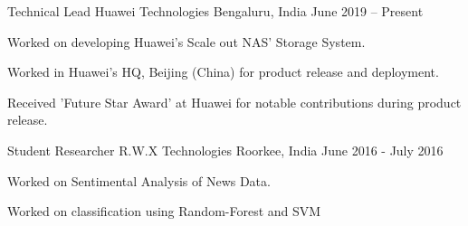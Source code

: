 

\begin{cventries}

 \cventry
    {Technical Lead} %
    {Huawei Technologies} %
    {Bengaluru, India} %
    {June 2019 – Present} %
    {
      \begin{cvitems} %
        \item {Worked on developing Huawei's Scale out NAS' Storage System.}
        \item {Worked in Huawei's HQ, Beijing (China) for product release and deployment.}
        \item {Received 'Future Star Award' at Huawei for notable contributions during product release.}
      \end{cvitems}
    }
  \cventry
    {Student Researcher} %
    {R.W.X Technologies} %
    {Roorkee, India} %
    {June 2016 - July 2016} %
    {
      \begin{cvitems} %
        \item {Worked on Sentimental Analysis of News Data.}
        \item {Worked on classification using Random-Forest and SVM}
      \end{cvitems}
    }


\end{cventries}
